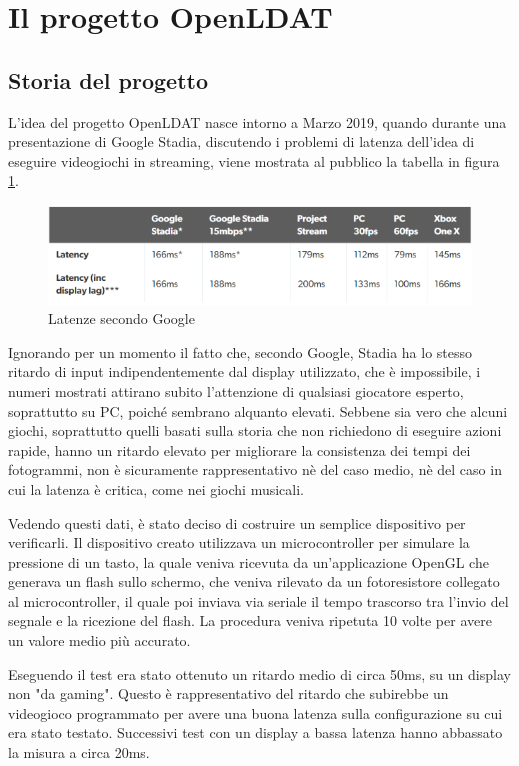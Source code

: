 \section{Il progetto OpenLDAT}
\subsection{Storia del progetto}
L'idea del progetto OpenLDAT nasce intorno a Marzo 2019, quando durante una presentazione di Google Stadia, discutendo i problemi di latenza dell'idea di eseguire videogiochi in streaming, viene mostrata al pubblico la tabella in figura \ref{fig:stadialies}.
\begin{figure}[h]
	\centering
	\includegraphics[width=\textwidth]{Chapter01/res/lies.png}
	\caption{Latenze secondo Google}
	\label{fig:stadialies}
\end{figure}

Ignorando per un momento il fatto che, secondo Google, Stadia ha lo stesso ritardo di input indipendentemente dal display utilizzato, che è impossibile, i numeri mostrati attirano subito l'attenzione di qualsiasi giocatore esperto, soprattutto su PC, poiché sembrano alquanto elevati. Sebbene sia vero che alcuni giochi, soprattutto quelli basati sulla storia che non richiedono di eseguire azioni rapide, hanno un ritardo elevato per migliorare la consistenza dei tempi dei fotogrammi, non è sicuramente rappresentativo nè del caso medio, nè del caso in cui la latenza è critica, come nei giochi musicali.

Vedendo questi dati, è stato deciso di costruire un semplice dispositivo per verificarli. Il dispositivo creato utilizzava un microcontroller per simulare la pressione di un tasto, la quale veniva ricevuta da un'applicazione OpenGL che generava un flash sullo schermo, che veniva rilevato da un fotoresistore collegato al microcontroller, il quale poi inviava via seriale il tempo trascorso tra l'invio del segnale e la ricezione del flash. La procedura veniva ripetuta 10 volte per avere un valore medio più accurato.

Eseguendo il test era stato ottenuto un ritardo medio di circa 50ms\cite{fdossena1}, su un display non "da gaming". Questo è rappresentativo del ritardo che subirebbe un videogioco programmato per avere una buona latenza sulla configurazione su cui era stato testato. Successivi test con un display a bassa latenza hanno abbassato la misura a circa 20ms.

